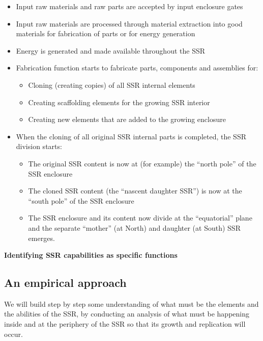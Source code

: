 \begin{itemize}
\item Input raw materials and raw parts are accepted by input enclosure
gates
\item Input raw materials are processed through material extraction into
good materials for fabrication of parts or for energy generation
\item Energy is generated and made available throughout the SSR
\item Fabrication function starts to fabricate parts, components and
assemblies for: 

\begin{itemize}
\item Cloning (creating copies) of all SSR internal elements
\item Creating scaffolding elements for the growing SSR interior
\item Creating new elements that are added to the growing enclosure
\end{itemize}
\item When the cloning of all original SSR internal parts is completed,
the SSR division starts:

\begin{itemize}
\item The original SSR content is now at (for example) the “north pole”
of the SSR enclosure
\item The cloned SSR content (the “nascent daughter SSR”) is now at the
“south pole” of the SSR enclosure
\item The SSR enclosure and its content now divide at the “equatorial”
plane and the separate “mother” (at North) and daughter (at South) SSR
emerges.
\end{itemize}
\end{itemize}
{\bfseries
\hypertarget{RefHeading3046306210128}{}Identifying SSR capabilities as
specific functions}

\subsection[An empirical approach]{An empirical approach}
\hypertarget{RefHeading3048306210128}{}We will build step by step some
understanding of what must be the elements and the abilities of the
SSR, by conducting an analysis of what must be happening inside and at
the periphery of the SSR so that its growth and replication will occur.


\bigskip

